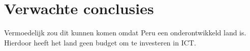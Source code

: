 \section{Verwachte conclusies}
\label{sec:verwachte_conclusies}
Vermoedelijk zou dit kunnen komen omdat Peru een onderontwikkeld land is. Hierdoor heeft het land geen budget om te investeren in ICT.

